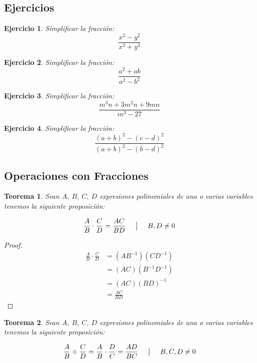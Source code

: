 \documentclass[A4paper, 10pt, oneside]{book}
\newtheorem{theorem}{Teorema}[chapter]
\newtheorem{exercise}{Ejercicio}[chapter]
\begin{document}
		\subsection*{Ejercicios}
		
		\begin{multicols}{2}
			\begin{exercise}
				Simplificar la fracción:
				$$\frac{x^2-y^2}{x^3+y^3}$$
			\end{exercise}
			\begin{exercise}
				Simplificar la fracción:
				$$\frac{a^2+ab}{a^2-b^2}$$
			\end{exercise}
			\begin{exercise}
				Simplificar la fracción:
				$$\frac{m^3n+3m^2n+9mn}{m^3-27}$$
			\end{exercise}
			\begin{exercise}
				Simplificar la fracción:
				$$\frac{(a+b)^2-(c-d)^2}{(a+b)^2-(b-d)^2}$$
			\end{exercise}
		\end{multicols}
	
	\subsection{Operaciones con Fracciones}
	
	\begin{theorem}
		\label{TeoMultF}
		Sean $A, \ B, \ C, \ D$ expresiones polinomiales de una o varias variables tenemos la siguiente proposición: 
		
		$$\frac{A}{B}\cdot \frac{C}{D} = \frac{AC}{BD} \hspace{5mm} \big| \hspace{5mm} B, D \neq 0$$
	\end{theorem}

	\begin{proof}
		\begin{align*}
			\frac{A}{B}\cdot \frac{C}{D} &= (AB^{-1})(CD^{-1})\\
			&=(AC)(B^{-1}D^{-1})\\
			&=(AC)(BD)^{-1}\\
			&=\frac{AC}{BD}
		\end{align*}
	\end{proof}

	\begin{theorem}
		\label{TeoDivF}
		Sean $A, \ B, \ C, \ D$ expresiones polinomiales de una o varias variables tenemos la siguiente proposición: 
		
		$$\frac{A}{B}\div \frac{C}{D} = \frac{A}{B} \cdot \frac{D}{C} = \frac{AD}{BC} \hspace{5mm} \big| \hspace{5mm} B, C, D \neq 0$$
	\end{theorem}
	
\end{document}
